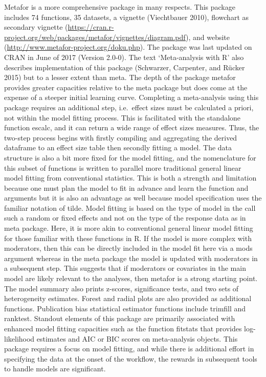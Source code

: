 \documentclass[fleqn,10pt]{wlpeerj} %
\begin{document}
Metafor is a more comprehensive package in many respects. This package
includes 74 functions, 35 datasets, a vignette (Viechtbauer 2010),
flowchart as secondary vignette
(\url{https://cran.r-project.org/web/packages/metafor/vignettes/diagram.pdf}),
and website (\url{http://www.metafor-project.org/doku.php}). The package
was last updated on CRAN in June of 2017 (Version 2.0-0). The text
`Meta-analysis with R' also describes implementation of this package
(Schwarzer, Carpenter, and Rücker 2015) but to a lesser extent than
meta. The depth of the package metafor provides greater capacities
relative to the meta package but does come at the expense of a steeper
initial learning curve. Completing a meta-analysis using this package
requires an additional step, i.e.~effect sizes must be calculated a
priori, not within the model fitting process. This is facilitated with
the standalone function escalc, and it can return a wide range of effect
sizes measures. Thus, the two-step process begins with firstly compiling
and aggregating the derived dataframe to an effect size table then
secondly fitting a model. The data structure is also a bit more fixed
for the model fitting, and the nomenclature for this subset of functions
is written to parallel more traditional general linear model fitting
from conventional statistics. This is both a strength and limitation
because one must plan the model to fit in advance and learn the function
and arguments but it is also an advantage as well because model
specification uses the familiar notation of tilde. Model fitting is
based on the type of model in the call such a random or fixed effects
and not on the type of the response data as in meta package. Here, it is
more akin to conventional general linear model fitting for those
familiar with these functions in R. If the model is more complex with
moderators, then this can be directly included in the model fit here via
a mods argument whereas in the meta package the model is updated with
moderators in a subsequent step. This suggests that if moderators or
covariates in the main model are likely relevant to the analyses, then
metafor is a strong starting point. The model summary also prints
z-scores, significance tests, and two sets of heterogeneity estimates.
Forest and radial plots are also provided as additional functions.
Publication bias statistical estimator functions include trimfill and
ranktest. Standout elements of this package are primarily associated
with enhanced model fitting capacities such as the function fitstats
that provides log-likelihood estimates and AIC or BIC scores on
meta-analysis objects. This package requires a focus on model fitting,
and while there is additional effort in specifying the data at the onset
of the workflow, the rewards in subsequent tools to handle models are
significant.
\end{document}
